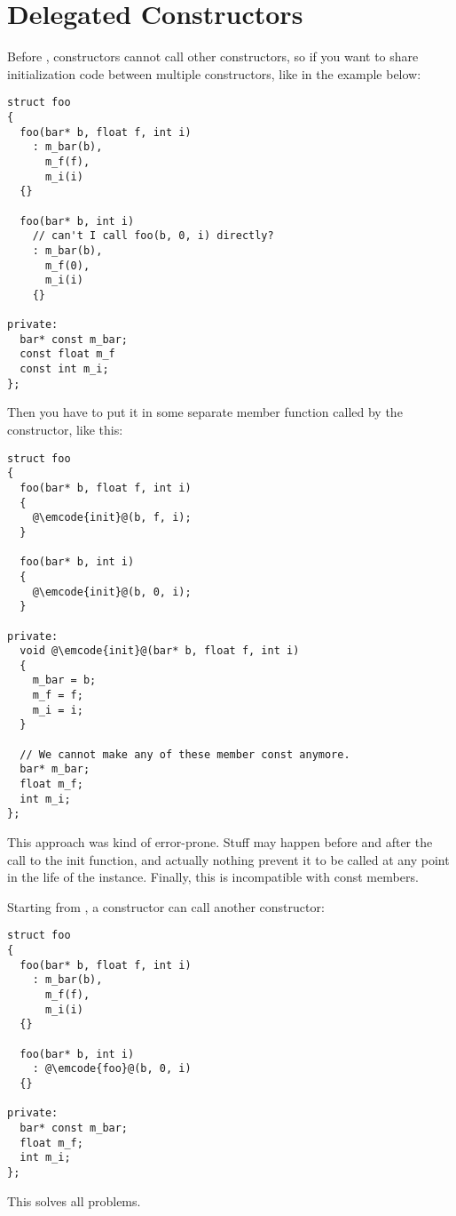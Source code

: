 \section{Delegated Constructors}

Before , constructors cannot call other constructors, so if you
want to share initialization code between multiple constructors,
like in the example below:

\begin{lstlisting}
struct foo
{
  foo(bar* b, float f, int i)
    : m_bar(b),
      m_f(f),
      m_i(i)
  {}
  
  foo(bar* b, int i)
    // can't I call foo(b, 0, i) directly?
    : m_bar(b),
      m_f(0),
      m_i(i)
    {}

private:
  bar* const m_bar;
  const float m_f
  const int m_i;
};
\end{lstlisting}

Then you have to put it in some separate member function called by the
constructor, like this:

\begin{lstlisting}
struct foo
{
  foo(bar* b, float f, int i)
  {
    @\emcode{init}@(b, f, i);
  }
  
  foo(bar* b, int i)
  {
    @\emcode{init}@(b, 0, i);
  }

private:
  void @\emcode{init}@(bar* b, float f, int i)
  {
    m_bar = b;
    m_f = f;
    m_i = i;
  }

  // We cannot make any of these member const anymore.
  bar* m_bar;
  float m_f;  
  int m_i;
};
\end{lstlisting}

This approach was kind of error-prone. Stuff may happen before and
after the call to the init function, and actually nothing prevent it
to be called at any point in the life of the instance. Finally, this
is incompatible with const members.


Starting from , a constructor can call another constructor:

\begin{lstlisting}
struct foo
{
  foo(bar* b, float f, int i)
    : m_bar(b),
      m_f(f),
      m_i(i)
  {}
  
  foo(bar* b, int i)
    : @\emcode{foo}@(b, 0, i)
  {}

private:
  bar* const m_bar;
  float m_f;
  int m_i;
};
\end{lstlisting}

This solves all problems.
